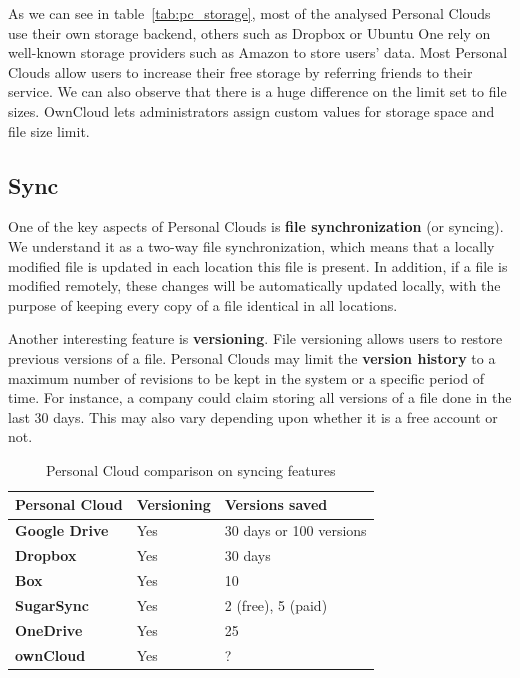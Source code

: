 As we can see in table~\ref{tab:pc_storage}, most of the analysed Personal Clouds use their own storage backend, others such as Dropbox or Ubuntu One rely on well-known storage providers such as Amazon to store users' data. Most Personal Clouds allow users to increase their free storage by referring friends to their service. We can also observe that there is a huge difference on the limit set to file sizes. OwnCloud lets administrators assign custom values for storage space and file size limit.

\subsection{Sync}
One of the key aspects of Personal Clouds is \textbf{file synchronization} (or syncing). We understand it as a two-way file synchronization, which means that a locally modified file is updated in each location this file is present. In addition, if a file is modified remotely, these changes will be automatically updated locally, with the purpose of keeping every copy of a file identical in all locations.

Another interesting feature is \textbf{versioning}. File versioning allows users to restore previous versions of a file. Personal Clouds may limit the \textbf{version history} to a maximum number of revisions to be kept in the system or a specific period of time. For instance, a company could claim storing all versions of a file done in the last 30 days. This may also vary depending upon whether it is a free account or not.


{
\def\arraystretch{1.5}

\begin{table}
\begin{center}
    \begin{tabular}{ | p{3.3cm} | p{2cm} | p{2.9cm} | }
    \hline
    \rowcolor[gray]{0.8}

	\textbf{Personal Cloud} &
	\textbf{Versioning} & 
	\textbf{Versions saved} \\ \hline

	\textbf{Google Drive} &
	Yes &
	30 days or 100 versions \\ \hline

	\textbf{Dropbox} &
	Yes &
	30 days \\ \hline
	
	\textbf{Box} &
	Yes &
	10 \\ \hline
	
	\textbf{SugarSync} & 
	Yes &
	2 (free), 5 (paid) \\ \hline
	
	\textbf{OneDrive} & 
	Yes &
	25 \\ \hline
	
	\textbf{ownCloud} &
	Yes &
	? \\ \hline

    \end{tabular}
    \caption{Personal Cloud comparison on syncing features}
    \label{tab:pc_syncing}
\end{center}
\end{table}
}

